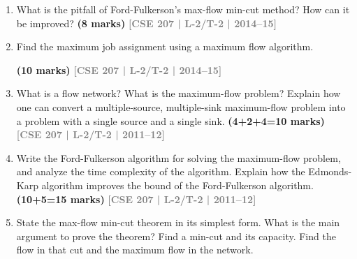 \documentclass[12pt]{article}
\newcommand{\yr}[1]{\hfill\textcolor{gray}{\small\textbf{[#1]}}}
\newcommand{\mk}[1]{\textcolor{orange!70!black}{\small\textbf{(#1 marks)}}}
\begin{document}
\begin{enumerate}
\item What is the pitfall of Ford-Fulkerson's max-flow min-cut method? How can it be improved? \mk{8}
\yr{CSE 207 | L-2/T-2 | 2014--15}


\item Find the maximum job assignment using a maximum flow algorithm.

\begin{center}
\end{center}
 \mk{10} \yr{CSE 207 | L-2/T-2 | 2014--15}


\item What is a flow network? What is the maximum-flow problem? Explain how one can convert a multiple-source, multiple-sink maximum-flow problem into a problem with a single source and a single sink. \mk{4+2+4=10}
\yr{CSE 207 | L-2/T-2 | 2011--12}


\item Write the Ford-Fulkerson algorithm for solving the maximum-flow problem, and analyze the time complexity of the algorithm. Explain how the Edmonds-Karp algorithm improves the bound of the Ford-Fulkerson algorithm. \mk{10+5=15}
\yr{CSE 207 | L-2/T-2 | 2011--12}


\item State the max-flow min-cut theorem in its simplest form. What is the main argument to prove the theorem? Find a min-cut and its capacity. Find the flow in that cut and the maximum flow in the network.

\begin{center}
  \begin{tikzpicture}[
  every node/.style={circle, draw, minimum size=0.9cm, font=\bfseries},
  edge label/.style={rectangle, draw=none, font=\normalfont\small},
  every path/.style={->, line width=1pt},
]


\end{tikzpicture}
\end{center}
\end{enumerate}
\end{document}
